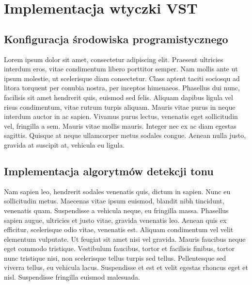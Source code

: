 
\setlength{\parindent}{1.25cm} %

\section{Implementacja wtyczki VST}

\subsection{Konfiguracja środowiska programistycznego}
\begin{spacing}{1.5} %
    Lorem ipsum dolor sit amet, consectetur adipiscing elit. Praesent ultricies interdum eros, vitae condimentum libero porttitor semper. Nam mollis ante ut ipsum molestie, ut scelerisque diam consectetur. Class aptent taciti sociosqu ad litora torquent per conubia nostra, per inceptos himenaeos. Phasellus dui nunc, facilisis sit amet hendrerit quis, euismod sed felis. Aliquam dapibus ligula vel risus condimentum, vitae rutrum turpis aliquam. Mauris vitae purus in neque interdum auctor in ac sapien. Vivamus purus lectus, venenatis eget sollicitudin vel, fringilla a sem. Mauris vitae mollis mauris. Integer nec ex ac diam egestas sagittis. Quisque at neque ullamcorper metus sodales congue. Aenean nulla justo, gravida at suscipit at, vehicula eu ligula. 
\end{spacing} %

\subsection{Implementacja algorytmów detekcji tonu}
\begin{spacing}{1.5} %
    Nam sapien leo, hendrerit sodales venenatis quis, dictum in sapien. Nunc eu sollicitudin metus. Maecenas vitae ipsum euismod, blandit nibh tincidunt, venenatis quam. Suspendisse a vehicula neque, eu fringilla massa. Phasellus sapien augue, ultricies et justo vitae, gravida venenatis leo. Aenean quis ex efficitur, scelerisque odio vitae, venenatis est. Aliquam condimentum vel velit elementum vulputate. Ut feugiat sit amet nisi vel gravida. Mauris faucibus neque eget commodo tristique. Vestibulum faucibus, tortor et facilisis finibus, tortor nunc tristique nisi, non scelerisque tellus turpis sed tellus. Pellentesque sed viverra tellus, eu vehicula lacus. Suspendisse et est et velit egestas rhoncus eget et nisl. Suspendisse fringilla euismod malesuada. 
\end{spacing} %

